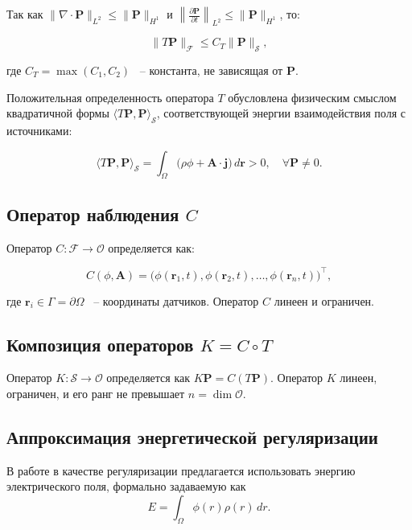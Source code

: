 \documentclass[a4paper,14pt,oneside,openany]{extarticle}
\begin{document}
Так как $\|\nabla \cdot \mathbf{P}\|_{L^2} \leq \|\mathbf{P}\|_{H^1}$ и 
$\left\|\frac{\partial \mathbf{P}}{\partial t}\right\|_{L^2} \leq \|\mathbf{P}\|_{H^1}$, то:

\begin{equation}
    \|T\mathbf{P}\|_{\mathcal{F}} \leq C_T \|\mathbf{P}\|_{\mathcal{S}},
\end{equation}

где $C_T = \max(C_1, C_2)$ ~-- константа, не зависящая от $\mathbf{P}$.

Положительная определенность оператора $T$ обусловлена физическим смыслом квадратичной 
формы $\langle T\mathbf{P}, \mathbf{P} \rangle_{\mathcal{S}}$, соответствующей энергии взаимодействия поля с источниками:

\begin{equation}
    \langle T\mathbf{P}, \mathbf{P} \rangle_{\mathcal{S}} = \int_\Omega \bigl(\rho \phi + \mathbf{A} \cdot \mathbf{j}\bigr) \, d\mathbf{r} > 0, \quad \forall \mathbf{P} \neq 0.
\end{equation}

\subsection{Оператор наблюдения $C$}
Оператор $C: \mathcal{F} \to \mathcal{O}$ определяется как:

\begin{equation}
    C(\phi, \mathbf{A}) = \bigl(\phi(\mathbf{r}_1, t), \phi(\mathbf{r}_2, t), \dots, \phi(\mathbf{r}_n, t)\bigr)^\top,
\end{equation}

где $\mathbf{r}_i \in \Gamma = \partial\Omega$ ~-- координаты датчиков. Оператор $C$ линеен и ограничен.

\subsection{Композиция операторов $K = C \circ T$}
Оператор $K: \mathcal{S} \to \mathcal{O}$ определяется как $K\mathbf{P} = C(T\mathbf{P})$.
 Оператор $K$ линеен, ограничен, и его ранг не превышает $n = \dim \mathcal{O}$.

\subsection{Аппроксимация энергетической регуляризации}
\label{subsec:regularization}
В работе в качестве регуляризации предлагается использовать энергию электрического поля, формально задаваемую как
\[ E = \int_{\Omega} \phi(r)\rho(r)\,dr. \]
\end{document}

